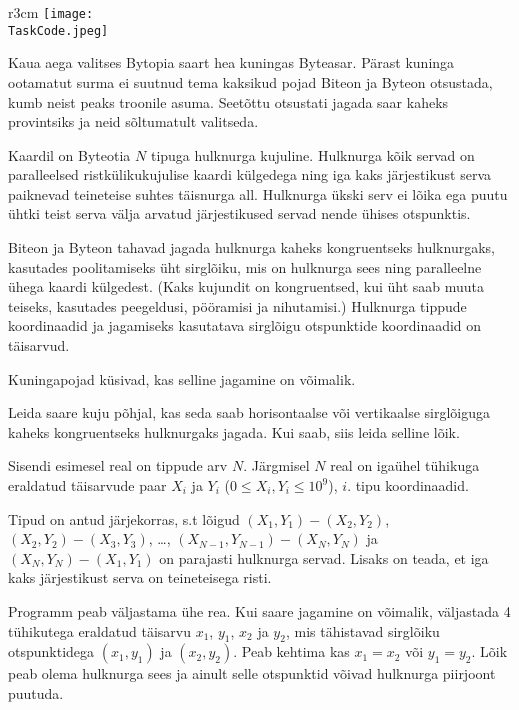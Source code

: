 \documentclass{boi2014-et}
\renewcommand{\TaskCode}{demarcation}
\begin{document}
    \begin{wrapfigure}{r}{3cm}
        \vspace{-24pt}
        \texttt{[image: \\TaskCode.jpeg]}
    \end{wrapfigure}

    Kaua aega valitses Bytopia saart hea kuningas Byteasar.
    Pärast kuninga ootamatut surma ei suutnud tema kaksikud pojad
    Biteon ja Byteon otsustada, kumb neist peaks troonile asuma.
    Seetõttu otsustati jagada saar kaheks provintsiks ja neid
    sõltumatult valitseda.

    Kaardil on Byteotia $N$ tipuga hulknurga kujuline.
    Hulknurga kõik servad on paralleelsed ristkülikukujulise kaardi külgedega ning
    iga kaks järjestikust serva paiknevad teineteise suhtes täisnurga all.
    Hulknurga ükski serv ei lõika ega puutu ühtki teist serva välja arvatud
    järjestikused servad nende ühises otspunktis.

    Biteon ja Byteon tahavad jagada hulknurga kaheks kongruentseks hulknurgaks,
    kasutades poolitamiseks üht sirglõiku,
    mis on hulknurga sees ning paralleelne ühega kaardi külgedest.
    (Kaks kujundit on kongruentsed, kui üht saab muuta teiseks,
    kasutades peegeldusi, pööramisi ja nihutamisi.)
    Hulknurga tippude koordinaadid ja jagamiseks
    kasutatava sirglõigu otspunktide koordinaadid on täisarvud.

    Kuningapojad küsivad, kas selline jagamine on võimalik.

    \Task

    Leida saare kuju põhjal, kas seda saab horisontaalse või vertikaalse sirglõiguga
    kaheks kongruentseks hulknurgaks jagada.
    Kui saab, siis leida selline lõik.

    \Input

    Sisendi esimesel real on tippude arv $N$.
    Järgmisel $N$ real on igaühel tühikuga eraldatud täisarvude paar
    $X_i$ ja $Y_i$ ($0 \le X_i, Y_i \le 10^9$), $i$. tipu koordinaadid.

    Tipud on antud järjekorras, s.t lõigud $(X_1,Y_1) - (X_2,Y_2)$,
    $(X_2,Y_2) - (X_3,Y_3)$, \ldots, $(X_{N-1},Y_{N-1}) - (X_N,Y_N)$ ja
    $(X_N,Y_N) - (X_1,Y_1)$ on parajasti hulknurga servad.
    Lisaks on teada, et iga kaks järjestikust serva on teineteisega risti.

    \Output

    Programm peab väljastama ühe rea.
    Kui saare jagamine on võimalik, väljastada 4 tühikutega eraldatud täisarvu
    $x_1$, $y_1$, $x_2$ ja $y_2$, mis tähistavad sirglõiku otspunktidega
    $(x_1, y_1)$ ja $(x_2, y_2)$.
    Peab kehtima kas $x_1 = x_2$ või $y_1 = y_2$.
    Lõik peab olema hulknurga sees ja ainult selle otspunktid võivad
    hulknurga piirjoont puutuda.
\end{document}
